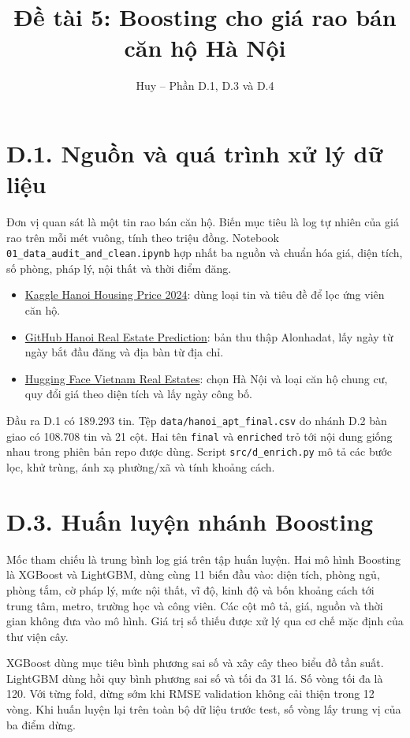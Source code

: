\documentclass[11pt,a4paper]{article}
\title{Đề tài 5: Boosting cho giá rao bán căn hộ Hà Nội}
\author{Huy -- Phần D.1, D.3 và D.4}
\date{}
\begin{document}
\maketitle

\section{D.1. Nguồn và quá trình xử lý dữ liệu}
Đơn vị quan sát là một tin rao bán căn hộ. Biến mục tiêu là log tự nhiên của giá rao trên mỗi mét vuông, tính theo triệu đồng.
Notebook \texttt{01\_data\_audit\_and\_clean.ipynb} hợp nhất ba nguồn và chuẩn hóa giá, diện tích, số phòng, pháp lý, nội thất và thời điểm đăng.
\begin{itemize}
  \item \href{https://www.kaggle.com/datasets/huytrngquc/hanoi-housing-price-2024}{Kaggle Hanoi Housing Price 2024}: dùng loại tin và tiêu đề để lọc ứng viên căn hộ.
  \item \href{https://github.com/hsgsstudent/hanoi_real_estate_prediction}{GitHub Hanoi Real Estate Prediction}: bản thu thập Alonhadat, lấy ngày từ ngày bắt đầu đăng và địa bàn từ địa chỉ.
  \item \href{https://huggingface.co/datasets/tinixai/vietnam-real-estates}{Hugging Face Vietnam Real Estates}: chọn Hà Nội và loại căn hộ chung cư, quy đổi giá theo diện tích và lấy ngày công bố.
\end{itemize}
Đầu ra D.1 có 189.293 tin. Tệp \texttt{data/hanoi\_apt\_final.csv} do nhánh D.2 bàn giao có 108.708 tin và 21 cột. Hai tên \texttt{final} và \texttt{enriched} trỏ tới nội dung giống nhau trong phiên bản repo được dùng. Script \texttt{src/d\_enrich.py} mô tả các bước lọc, khử trùng, ánh xạ phường/xã và tính khoảng cách.

\section{D.3. Huấn luyện nhánh Boosting}
Mốc tham chiếu là trung bình log giá trên tập huấn luyện. Hai mô hình Boosting là XGBoost và LightGBM, dùng cùng 11 biến đầu vào: diện tích, phòng ngủ, phòng tắm, cờ pháp lý, mức nội thất, vĩ độ, kinh độ và bốn khoảng cách tới trung tâm, metro, trường học và công viên. Các cột mô tả, giá, nguồn và thời gian không đưa vào mô hình. Giá trị số thiếu được xử lý qua cơ chế mặc định của thư viện cây.

XGBoost dùng mục tiêu bình phương sai số và xây cây theo biểu đồ tần suất. LightGBM dùng hồi quy bình phương sai số và tối đa 31 lá. Số vòng tối đa là 120. Với từng fold, dừng sớm khi RMSE validation không cải thiện trong 12 vòng. Khi huấn luyện lại trên toàn bộ dữ liệu trước test, số vòng lấy trung vị của ba điểm dừng.
\end{document}
